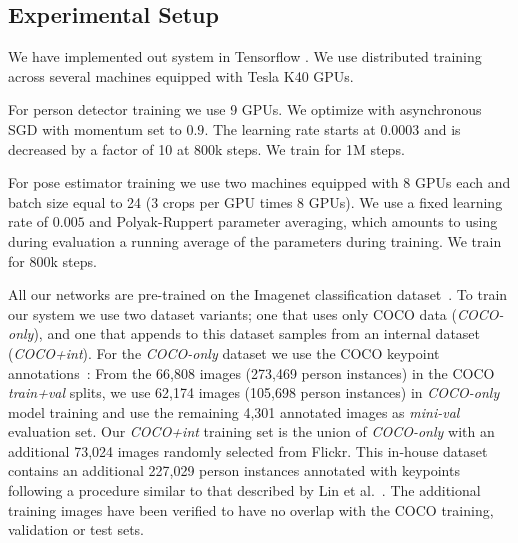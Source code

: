 \documentclass[10pt,twocolumn,letterpaper]{article}
\begin{document}
\begin{table*}
\centering
\caption{Performance on COCO keypoint \textbf{test-standard} split.}
\label{table:coco_results_teststandard}
\end{table*}

\subsection{Experimental Setup}
\label{sec:experimental_setup}

We have implemented out system in Tensorflow \cite{tensorflow2015-whitepaper}. We use distributed training across several machines equipped with Tesla K40 GPUs.

For person detector training we use 9 GPUs. We optimize with asynchronous SGD with momentum set to $0.9$. The learning rate starts at $0.0003$ and is decreased by a factor of 10 at $800$k steps. We train for 1M steps.

For pose estimator training we use two machines equipped with 8 GPUs each and batch size equal to 24 (3 crops per GPU times 8 GPUs). We use a fixed learning rate of $0.005$ and Polyak-Ruppert parameter averaging, which amounts to using during evaluation a running average of the parameters during training. We train for $800$k steps.

All our networks are pre-trained on the Imagenet classification dataset~\cite{imagenet2015}. To train our system we use two dataset variants; one that uses only COCO data (\emph{COCO-only}), and one that appends to this dataset samples from an internal dataset (\emph{COCO+int}). For the \emph{COCO-only} dataset we use the COCO keypoint annotations~\cite{lin2014microsoft}: From the 66,808 images (273,469 person instances) in the COCO \emph{train+val} splits, we use 62,174 images (105,698 person instances) in \emph{COCO-only} model training and use the remaining 4,301 annotated images as \emph{mini-val} evaluation set. Our \emph{COCO+int} training set is the union of \emph{COCO-only} with an additional 73,024 images randomly selected from Flickr. This in-house dataset contains an additional 227,029 person instances annotated with keypoints following a procedure similar to that described by Lin et al.~\cite{keypointchallenge}. The additional training images have been verified to have no overlap with the COCO training, validation or test sets.
\end{document}
